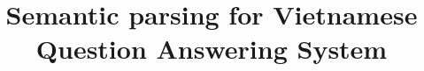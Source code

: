 \documentclass[12pt]{article}
\begin{document}
\title{Semantic parsing for Vietnamese Question Answering System
}
\scriptsize

\maketitle

\begin{abstract}

\end{abstract}











\end{document}
